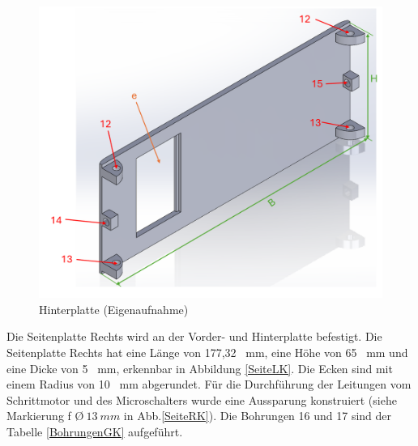 	\begin{figure}[H]
		\begin{center}
			\includegraphics[width=\textwidth]{Images/Konstruktion/HinterK.png}
			\caption{Hinterplatte (Eigenaufnahme)} \label{HinterK}
		\end{center}
	\end{figure}

Die Seitenplatte Rechts wird an der Vorder- und Hinterplatte befestigt. Die Seitenplatte Rechts hat eine Länge von 177,32 \ mm, eine Höhe von 65 \ mm und eine Dicke von 5 \ mm, erkennbar in Abbildung \ref{SeiteLK}. Die Ecken sind mit einem Radius von 10 \ mm abgerundet. Für die Durchführung der Leitungen vom Schrittmotor und des Microschalters wurde eine Aussparung konstruiert (siehe Markierung f \O $ \ 13 \ mm$  in Abb.\ref{SeiteRK}). Die Bohrungen 16 und 17 sind der Tabelle \ref{BohrungenGK} aufgeführt. 


